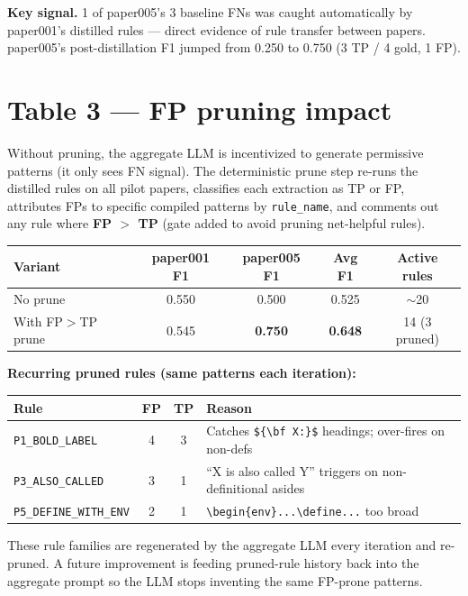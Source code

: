 \documentclass[10pt]{article}
\begin{document}
\medskip
\noindent
{\small \textbf{Key signal.} 1 of paper005's 3 baseline FNs was caught automatically by paper001's distilled rules --- direct evidence of rule transfer between papers. paper005's post-distillation F1 jumped from 0.250 to 0.750 (3 TP / 4 gold, 1 FP).}

\section*{Table 3 --- FP pruning impact}

\noindent
Without pruning, the aggregate LLM is incentivized to generate permissive patterns (it only sees FN signal). The deterministic prune step re-runs the distilled rules on all pilot papers, classifies each extraction as TP or FP, attributes FPs to specific compiled patterns by \texttt{rule\_name}, and comments out any rule where \textbf{FP $>$ TP} (gate added to avoid pruning net-helpful rules).

\medskip
\begin{tabular}{lcccc}
\toprule
\textbf{Variant} & \textbf{paper001 F1} & \textbf{paper005 F1} & \textbf{Avg F1} & \textbf{Active rules} \\
\midrule
No prune        & 0.550 & 0.500 & 0.525 & $\sim$20 \\
With FP$>$TP prune & 0.545 & \textbf{0.750} & \textbf{0.648} & 14 (3 pruned) \\
\bottomrule
\end{tabular}

\medskip
\noindent
\textbf{Recurring pruned rules (same patterns each iteration):}
\medskip

\begin{tabular}{lcc l}
\toprule
\textbf{Rule} & \textbf{FP} & \textbf{TP} & \textbf{Reason} \\
\midrule
\texttt{P1\_BOLD\_LABEL}    & 4 & 3 & Catches \texttt{\$\{\textbackslash bf X:\}\$} headings; over-fires on non-defs \\
\texttt{P3\_ALSO\_CALLED}   & 3 & 1 & ``X is also called Y'' triggers on non-definitional asides \\
\texttt{P5\_DEFINE\_WITH\_ENV} & 2 & 1 & \texttt{\textbackslash begin\{env\}...\textbackslash define...} too broad \\
\bottomrule
\end{tabular}

\medskip
\noindent
{\small These rule families are regenerated by the aggregate LLM every iteration and re-pruned. A future improvement is feeding pruned-rule history back into the aggregate prompt so the LLM stops inventing the same FP-prone patterns.}
\end{document}
